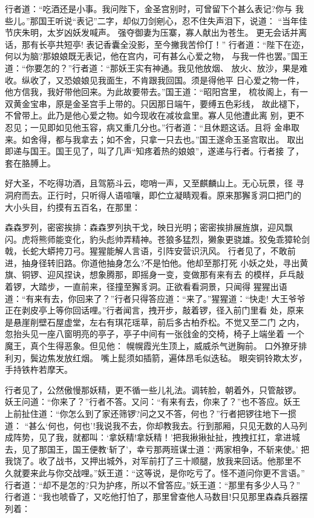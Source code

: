 行者道：“吃酒还是小事。我问陛下，金圣宫别时，可曾留下个甚么表记?你与
我些儿。”那国王听说“表记”二字，却似刀剑剜心，忍不住失声泪下，说道：
“当年佳节庆朱明，太岁凶妖发喊声。
强夺御妻为压寨，寡人献出为苍生。
更无会话并离话，那有长亭共短亭!
表记香囊全没影，至今撇我苦伶仃！”
行者道：“陛下在迩，何以为脑?那娘娘既无表记，他在宫内，可有甚么心爱之物，
与我一件也罢。”国王道：“你要怎的？”行者道：“那妖王实有神通。我见他放烟、
放火、放沙，果是难收。纵收了，又恐娘娘见我面生，不肯跟我回国。须是得他平
日心爱之物一件，他方信我，我好带他回来。为此故要带去。”国王道：“昭阳宫里，
梳妆阁上，有一双黄金宝串，原是金圣宫手上带的。只因那日端午，要缚五色彩线，
故此褪下，不曾带上。此乃是他心爱之物。如今现收在减妆盒里。寡人见他遭此离
别，更不忍见；一见即如见他玉容，病又重几分也。”行者道：“且休题这话。且将
金串取来。如舍得，都与我拿去；如不舍，只拿一只去也。”国王遂命玉圣宫取出。
取出即递与国王。国王见了，叫了几声“知疼着热的娘娘”，遂递与行者。行者接
了，套在胳膊上。

好大圣，不吃得功酒，且驾筋斗云，唿哨一声，又至麒麟山上。无心玩景，径
寻洞府而去。正行时，只听得人语喧嚷，即伫立凝睛观看。原来那獬豸洞口把门的
大小头目，约摸有五百名，在那里：

森森罗列，密密挨排：森森罗列执干戈，映日光明；密密挨排展旌旗，迎风飘
闪。虎将熊师能变化，豹头彪帅弄精神。苍狼多猛烈，獭象更骁雄。狡兔乖獐轮剑
戟，长蛇大蟒挎刀弓。猩猩能解人言语，引阵安营识汛风。
行者见了，不敢前进，抽身径转旧路。你道他抽身怎么?不是怕他。他却至那打死
小妖之处，寻出黄旗、铜锣、迎风捏诀，想象腾那，即摇身一变，变做那有来有去
的模样，乒乓敲着锣，大踏步，一直前来，径撞至獬豸洞。正欲看看洞景，只闻得
猩猩出语道：“有来有去，你回来了？”行者只得答应道：“来了。”猩猩道：“快走!
大王爷爷正在剥皮亭上等你回话哩。”行者闻言，拽开步，敲着锣，径入前门里看
处，原来是悬崖削壁石屋虚堂，左右有琪花瑶草，前后多古柏乔松。不觉又至二门
之内，忽抬头见一座八窗明亮的亭子，亭子中间有一张戗金的交椅，椅子上端坐着
一个魔王，真个生得恶象。但见他：
幌幌霞光生顶上，威威杀气迸胸前。
口外獠牙排利刃，鬓边焦发放红烟。
嘴上髭须如插箭，遍体昂毛似迭毡。
眼突铜铃欺太岁，手持铁杵若摩天。

行者见了，公然傲慢那妖精，更不循一些儿礼法。调转脸，朝着外，只管敲锣。
妖王问道：“你来了？”行者不答。又问：“有来有去，你来了？”也不答应。妖王
上前扯住道：“你怎么到了家还筛锣?问之又不答，何也？”行者把锣往地下一掼道：
“甚么‘何也，何也’!我说我不去，你却教我去。行到那厢，只见无数的人马列
成阵势，见了我，就都叫：‘拿妖精!拿妖精！’把我揪揪扯扯，拽拽扛扛，拿进城
去，见了那国王，国王便教‘斩了’，幸亏那两班谋士道：‘两家相争，不斩来使。’
把我饶了。收了战书，又押出城外，对军前打了三十顺腿，放我来回话。他那里不
久就要来此与你交战哩。”妖王道：“这等说，是你吃亏了。怪不道问你更不言语。”
行者道：“却不是怎的?只为护疼，所以不曾答应。”妖王道：“那里有多少人马？”
行者道：“我也唬昏了，又吃他打怕了，那里曾查他人马数目!只见那里森森兵器摆
列着：

